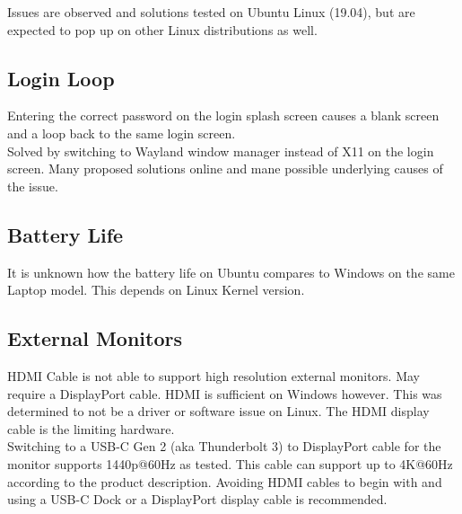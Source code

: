 \documentclass[8pt,letterpaper,twocolumn]{article}
\begin{document}
Issues are observed and solutions tested on Ubuntu Linux (19.04), but are expected to pop up on other Linux distributions as well.

\subsection{Login Loop}

Entering the correct password on the login splash screen causes a blank screen and a loop back to the same login screen.\\

Solved by switching to Wayland window manager instead of X11 on the login screen. Many proposed solutions online and mane possible underlying causes of the issue. 

\subsection{Battery Life}

It is unknown how the battery life on Ubuntu compares to Windows on the same Laptop model. This depends on Linux Kernel version.

\subsection{External Monitors}

HDMI Cable is not able to support high resolution external monitors. May require a DisplayPort cable. HDMI is sufficient on Windows however. This was determined to not be a driver or software issue on Linux. The HDMI display cable is the limiting hardware.\\

Switching to a USB-C Gen 2 (aka Thunderbolt 3) to DisplayPort cable for the monitor supports 1440p@60Hz as tested. This cable can support up to 4K@60Hz according to the product description. Avoiding HDMI cables to begin with and using a USB-C Dock or a DisplayPort display cable is recommended.
\end{document}
